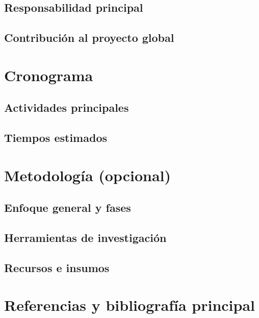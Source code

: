 \subsection{Responsabilidad principal}
\subsection{Contribución al proyecto global}

\section{Cronograma}
\subsection{Actividades principales}
\subsection{Tiempos estimados}

\section{Metodología (opcional)}
\subsection{Enfoque general y fases}
\subsection{Herramientas de investigación}
\subsection{Recursos e insumos}

\section{Referencias y bibliografía principal}

